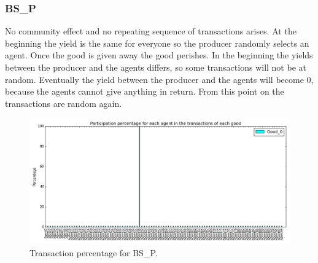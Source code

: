 \documentclass[twoside,openright]{uva-bachelor-thesis}
\begin{document}
\subsubsection{BS\_P}
No community effect and no repeating sequence of transactions arises. At the beginning the yield is the same for everyone so the producer randomly selects an agent. Once the good is given away the good perishes. In the beginning the yields between the producer and the agents differs, so some transactions will not be at random. Eventually the yield between the producer and the agents will become 0, because the agents cannot give anything in return. From this point on the transactions are random again.
\begin{figure}[h!]
\centering
\includegraphics[scale=0.4]{Simulation2_figures/GR_BS_P/Figure1_4k}
\caption{Transaction percentage for BS\_P.}
\end{figure}
\end{document}
